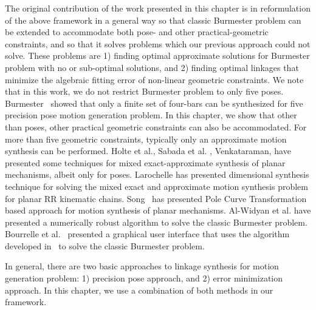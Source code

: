 The original contribution of the work presented in this chapter is in reformulation of the above framework in a general way so that classic Burmester problem can be extended to accommodate both pose- and other practical-geometric constraints, and so that it solves problems which our previous approach could not solve.
These problems are 1) finding optimal approximate solutions for Burmester problem with no or sub-optimal solutions, and  2) finding optimal linkages that minimize the algebraic fitting error of non-linear geometric constraints. We note that in this work, we do not restrict Burmester problem to only five poses.
Burmester~\cite{Burmester86} showed that only a finite set of four-bars can be synthesized for five precision pose motion generation problem. In this chapter, we show that other than poses, other practical geometric constraints can also be accommodated.
For more than five geometric constraints, typically only an approximate motion synthesis can be performed. Holte et al.\cite{holte2000}, Sabada et al. \cite{bawab1997}, Venkataraman\cite{Venkataraman1992}, have presented some techniques for mixed exact-approximate synthesis of planar mechanisms, albeit only for poses.
Larochelle\cite{Larochelle2015}  has presented dimensional synthesis technique for solving the mixed exact and approximate motion synthesis problem for planar RR kinematic chains.
Song~\cite{song2015} has presented Pole Curve Transformation based approach for motion synthesis of planar mechanisms.
Al-Widyan et al.\cite{Al-Widyan2002} have presented a numerically robust algorithm to solve the classic Burmester problem. Bourrelle et al.~\cite{bourrelle2007} presented a graphical user interface that uses the algorithm developed in~\cite{Al-Widyan2002} to solve the classic Burmester problem.

In general, there are two basic approaches to linkage synthesis for motion generation problem: 1) precision pose approach, and 2) error minimization approach. In this chapter, we use a combination of both methods in our framework.

